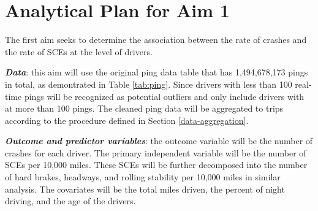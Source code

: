 \documentclass[12pt]{book}
\numberwithin{equation}{chapter}
\begin{document}
\begin{table}[H]

\caption{\label{tab:analysisshiftevent}SCEs data for hierarchical non-homogeneous Poisson process}
\centering
{}
\end{table}

\hypertarget{analytical-plan-for-aim-1}{%
\section{Analytical Plan for Aim 1}\label{analytical-plan-for-aim-1}}

The first aim seeks to determine the association between the rate of crashes and the rate of SCEs at the level of drivers.

\textbf{\emph{Data}}: this aim will use the original ping data table that has 1,494,678,173 pings in total, as demontrated in Table \ref{tab:ping}. Since drivers with less than 100 real-time pings will be recognized as potential outliers and only include drivers with at more than 100 pings. The cleaned ping data will be aggregated to trips according to the procedure defined in Section \ref{data-aggregation}.

\textbf{\emph{Outcome and predictor variables}}: the outcome variable will be the number of crashes for each driver. The primary independent variable will be the number of SCEs per 10,000 miles. These SCEs will be further decomposed into the number of hard brakes, headways, and rolling stability per 10,000 miles in similar analysis. The covariates will be the total miles driven, the percent of night driving, and the age of the drivers.
\end{document}
